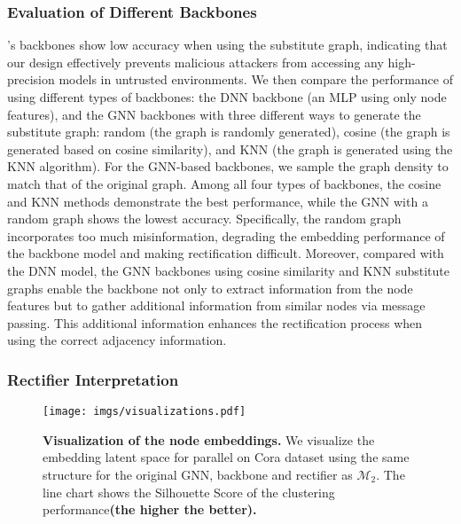 \subsubsection{Evaluation of Different Backbones}
\label{exp: backbones}
\mymethod's backbones show low accuracy when using the substitute graph, indicating that our design effectively prevents malicious attackers from accessing any high-precision models in untrusted environments.
We then compare the performance of \mymethod using different types of backbones: the DNN backbone (an MLP using only node features), and the GNN backbones with three different ways to generate the substitute graph: random  (the graph is randomly generated), cosine (the graph is generated based on cosine similarity), and KNN (the graph is generated using the KNN algorithm). For the GNN-based backbones, we sample the graph density to match that of the original graph. Among all four types of backbones, the cosine and KNN methods demonstrate the best performance, while the GNN with a random graph shows the lowest accuracy. Specifically, the random graph incorporates too much misinformation, degrading the embedding performance of the backbone model and making rectification difficult. Moreover, compared with the DNN model, the GNN backbones using cosine similarity and KNN substitute graphs enable the backbone not only to extract information from the node features but to gather additional information from similar nodes via message passing. This additional information enhances the rectification process when using the correct adjacency information.

\subsubsection{Rectifier Interpretation}

\begin{figure}[t]
\vspace{-3mm}
    \centering
    \texttt{[image: imgs/visualizations.pdf]}
    \caption{\textbf{Visualization of the node embeddings.} We visualize the embedding latent space for parallel \mymethod on Cora dataset using the same structure for the original GNN, backbone and rectifier as \textit{$\mathcal{M}_2$}. The line chart shows the Silhouette Score of the clustering performance\textbf{(the higher the better).}}
    \label{fig: visualizations}
    \vspace{-2mm}
\end{figure}

